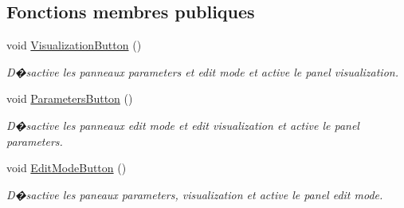 \subsection*{Fonctions membres publiques}
\begin{DoxyCompactItemize}
\item 
void \mbox{\hyperlink{class_navigation_ad4dbf103497aef10cc636c40f84dbdde}{Visualization\+Button}} ()
\begin{DoxyCompactList}\small\item\em D�sactive les panneaux parameters et edit mode et active le panel visualization. \end{DoxyCompactList}\item 
void \mbox{\hyperlink{class_navigation_adf000d0931e06c79e1e66f266d93e313}{Parameters\+Button}} ()
\begin{DoxyCompactList}\small\item\em D�sactive les panneaux edit mode et edit visualization et active le panel parameters. \end{DoxyCompactList}\item 
void \mbox{\hyperlink{class_navigation_af687f3df18da0e95175b04fe5cc7da56}{Edit\+Mode\+Button}} ()
\begin{DoxyCompactList}\small\item\em D�sactive les paneaux parameters, visualization et active le panel edit mode. \end{DoxyCompactList}\end{DoxyCompactItemize}

